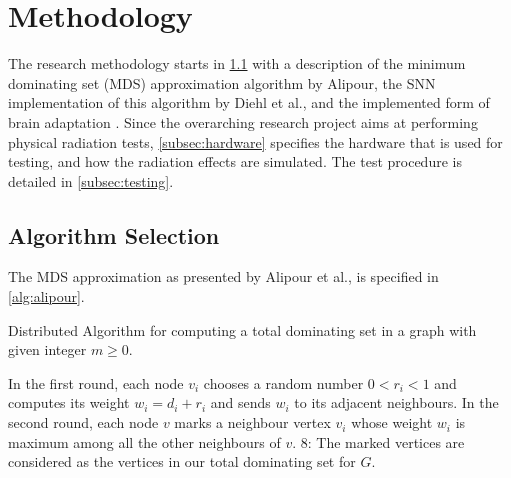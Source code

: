 \section{Methodology}\label{sec:methodology}
The research methodology starts in \cref{subsec:algorithm} with a description of the minimum dominating set (MDS) approximation algorithm by Alipour, the SNN implementation of this algorithm by Diehl et al., and the implemented form%
of brain adaptation \cite{alipour}\cite{diehl}. Since the overarching research project aims at performing physical radiation tests, \cref{subsec:hardware} specifies the hardware that is used for testing, and how the radiation effects are simulated. The test procedure is detailed in \cref{subsec:testing}.

\subsection{Algorithm Selection}\label{subsec:algorithm}
The MDS approximation as presented by Alipour et al., is specified in \cref{alg:alipour}.
\begin{algorithm}[h]%
    \caption{Distributed Algorithm for computing a total dominating set in a graph with given integer $m\geq 0$.}\label{alg:alipour}
    In the first round, each node $v_i$ chooses a random number $0<r_i<1$ and computes its weight $w_i=d_i+r_i$ and sends $w_i$ to its
    adjacent neighbours.\;
    In the second round, each node $v$ marks a neighbour vertex $v_i$ whose weight $w_i$ is maximum among all the other neighbours of $v$.\;
    8: The marked vertices are considered as the vertices in our total dominating set for $G$.\;
\end{algorithm}

